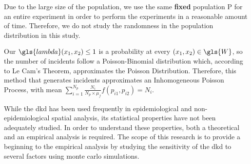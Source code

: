 Due to the large size of the population,
we use the same \textbf{fixed} population \gls{P} for an entire experiment
in order to perform the experiments in a reasonable amount of time.
Therefore,
we do not study the randomness in the population distribution in this study.

Our $\gls{lambda}(x_1, x_2) \leq 1$ is a probability at every $(x_1, x_2) \in \gls{W}$,
so the number of \glspl{incident} follow a Poisson-Binomial distribution which,
according to Le Cam's Theorem, approximates the Poisson Distribution.
Therefore, this method that generates \glspl{incident} approximates an Inhomogeneous Poisson Process,
with mean $\sum\limits_{i=1}^{N_p}{\frac{N_i}{N_p \times \mu_f} f(p_{i1}, p_{i2})} = N_i$.

While the \gls{dkd} has been used frequently in epidemiological and non-epidemiological spatial analysis,
its statistical properties have not been adequately studied.
In order to understand these properties,
both a theoretical and an empirical analysis is required.
The scope of this research is to provide a beginning to the empirical analysis by studying the sensitivity of the \gls{dkd} to several factors using monte carlo simulations.

